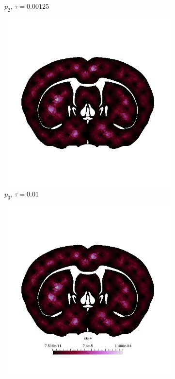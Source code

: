 \begin{figure}[h!]
\begin{subfigure}[b]{0.24\textwidth}
    \caption{$p_2$, $\tau=0.00125$}
  \end{subfigure}
  \begin{subfigure}[b]{0.24\textwidth}
    \includegraphics[width=\textwidth,height=\textheight,keepaspectratio,height=\textheight,keepaspectratio]{figures/4_mpet/biomedical/time/eta4_p3_dt1.png}
    \caption{$p_3$, $\tau=0.01$}
  \end{subfigure}
  \begin{subfigure}[b]{0.24\textwidth}
    \includegraphics[width=\textwidth,height=\textheight,keepaspectratio,height=\textheight,keepaspectratio]{figures/4_mpet/biomedical/time/eta4_p3_dt2.png}

\end{subfigure}
\end{figure}
